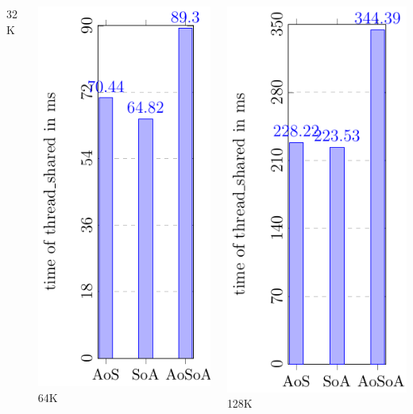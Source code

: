 \documentclass[aspectratio=169]{beamer}
\begin{document}
\begin{frame}
\begin{columns}
\begin{column}{0.25\textwidth}
	\small 32K
	\end{column}
	\begin{column}{0.25\textwidth}
	\includegraphics[scale=0.55]{figures/fig300.pdf}
	\small 64K
	\end{column}
	\begin{column}{0.25\textwidth}
	\includegraphics[scale=0.55]{figures/fig400.pdf}
	\small 128K
	\end{column}	
	\end{columns}
	

\end{frame}
\end{document}
